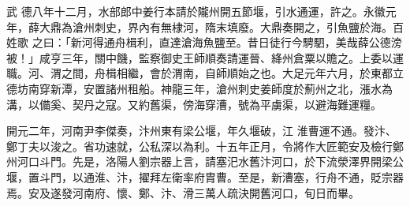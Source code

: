
\begin{pinyinscope}

 武
 德八年十二月，水部郎中姜行本請於隴州開五節堰，引水通運，許之。永徽元年，薛大鼎為滄州刺史，界內有無棣河，隋末填廢。大鼎奏開之，引魚鹽於海。百姓歌
 之曰：「新河得通舟楫利，直達滄海魚鹽至。昔日徒行今騁駟，美哉薛公德滂被！」咸亨三年，關中饑，監察御史王師順奏請運晉、絳州倉粟以贍之。上委以運職。河、渭之間，舟楫相繼，會於渭南，自師順始之也。大足元年六月，於東都立德坊南穿新潭，安置諸州租船。神龍三年，滄州刺史姜師度於薊州之北，漲水為溝，以備奚、契丹之寇。又約舊渠，傍海穿漕，號為平虜渠，以避海難運糧。



 開元二年，河南尹李傑奏，汴州東有梁公堰，年久堰破，江
 淮曹運不通。發汴、鄭丁夫以浚之。省功速就，公私深以為利。十五年正月，令將作大匠範安及檢行鄭州河口斗門。先是，洛陽人劉宗器上言，請塞汜水舊汴河口，於下流滎澤界開梁公堰，置斗門，以通淮、汴，擢拜左衛率府胄曹。至是，新漕塞，行舟不通，貶宗器焉。安及遂發河南府、懷、鄭、汴、滑三萬人疏決開舊河口，旬日而畢。




\end{pinyinscope}

